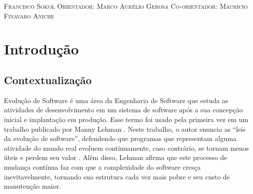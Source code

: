 \documentclass[a4paper, 12pt, twoside]{book}
\begin{document}
\begin{titlepage}
\vspace*{\fill}
\vspace{-5cm}
\vspace{2cm}
\center\textsc{{\Large Francisco Sokol}}
\vspace{1cm}
\center\textsc{{\large Orientador: Marco Aurélio Gerosa}}
\center\textsc{{\large Co-orientador: Maurício Finavaro Aniche}}
\vfill
\end{titlepage}


\pagestyle{plain}

\setcounter{page}{1}

\tableofcontents

\newpage

\chapter{Introdução}

    \section{Contextualização}
        Evolução de Software é uma área da Engenharia de Software que estuda as atividades de desenvolvimento
        em um sistema de software após a sua concepção inicial e implantação em produção. Esse termo foi 
        usado pela primeira vez em um trabalho publicado por Manny Lehman \cite{DBLP:series/springer/Mens08}. 
        Neste trabalho, o autor enuncia as ``leis da evolução de software'', defendendo que programas que 
        representam alguma atividade do mundo real evoluem continuamente, caso contrário, se tornam
        menos úteis e perdem seu valor \cite{Lehman1980b}. Além disso, Lehman afirma que este processo 
        de mudança contínua faz com que a complexidade do software cresça inevitavelmente, tornando sua 
        estrutura cada vez mais pobre e seu custo de manutenção maior.
        
\end{document}
